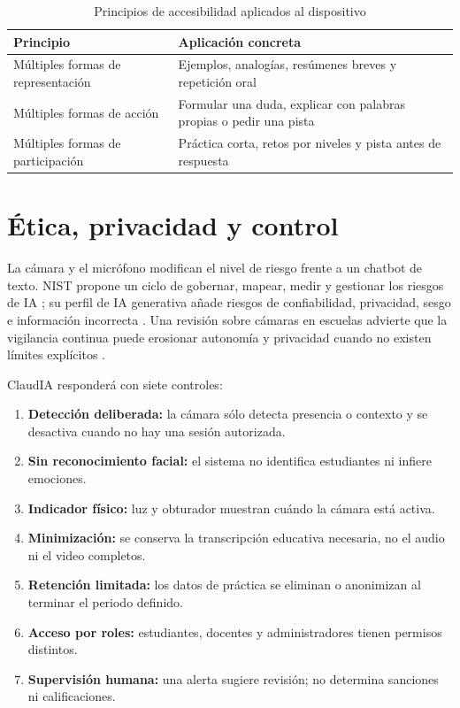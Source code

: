 \documentclass[letterpaper,11pt]{article}
\begin{document}
\begin{table}[H]
\centering
\caption{Principios de accesibilidad aplicados al dispositivo}
\begin{tabularx}{\textwidth}{@{}lX@{}}
\toprule
\textbf{Principio} & \textbf{Aplicación concreta} \\
\midrule
Múltiples formas de representación & Ejemplos, analogías, resúmenes breves y repetición oral \\
Múltiples formas de acción & Formular una duda, explicar con palabras propias o pedir una pista \\
Múltiples formas de participación & Práctica corta, retos por niveles y pista antes de respuesta \\
\bottomrule
\end{tabularx}
\end{table}

\clearpage

\section{Ética, privacidad y control}

La cámara y el micrófono modifican el nivel de riesgo frente a un chatbot de texto. NIST propone un ciclo de gobernar, mapear, medir y gestionar los riesgos de IA \cite{nist2023}; su perfil de IA generativa añade riesgos de confiabilidad, privacidad, sesgo e información incorrecta \cite{nist2024}. Una revisión sobre cámaras en escuelas advierte que la vigilancia continua puede erosionar autonomía y privacidad cuando no existen límites explícitos \cite{zulfiqar2026}.

ClaudIA responderá con siete controles:
\begin{enumerate}
  \item \textbf{Detección deliberada:} la cámara sólo detecta presencia o contexto y se desactiva cuando no hay una sesión autorizada.
  \item \textbf{Sin reconocimiento facial:} el sistema no identifica estudiantes ni infiere emociones.
  \item \textbf{Indicador físico:} luz y obturador muestran cuándo la cámara está activa.
  \item \textbf{Minimización:} se conserva la transcripción educativa necesaria, no el audio ni el video completos.
  \item \textbf{Retención limitada:} los datos de práctica se eliminan o anonimizan al terminar el periodo definido.
  \item \textbf{Acceso por roles:} estudiantes, docentes y administradores tienen permisos distintos.
  \item \textbf{Supervisión humana:} una alerta sugiere revisión; no determina sanciones ni calificaciones.
\end{enumerate}
\end{document}
